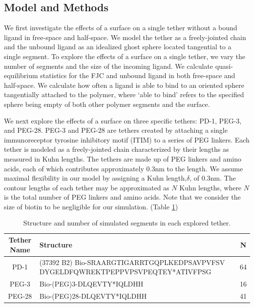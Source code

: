 \documentclass[../../AdvancementSummary.tex]{subfiles}
\begin{document}
\subsection{Model and Methods}

We first investigate the effects of a surface on a single tether without a bound ligand in free-space and half-space. We model the tether as a freely-jointed chain and the unbound ligand as an idealized ghost sphere located tangential to a single segment.  To explore the effects of a surface on a single tether, we vary the number of segments and the size of the incoming ligand. We calculate quasi-equilibrium statistics for the FJC and unbound ligand in both free-space and half-space. We calculate how often a ligand is able to bind to an oriented sphere tangentially attached to the polymer, where `able to bind' refers to the specified sphere being empty of both other polymer segments and the surface. 

We next explore the effects of a surface on three specific tethers: PD-1, PEG-3, and PEG-28.  PEG-3 and PEG-28 are tethers created by attaching a single immunoreceptor tyrosine inhibitory motif (ITIM) to a series of PEG linkers. Each tether is modeled as a freely-jointed chain characterized by their lengths as measured in Kuhn lengths. The tethers are made up of PEG linkers and amino acids, each of which contributes approximately 0.3nm to the length. We assume maximal flexibility in our model by assigning a Kuhn length,$\delta$, of 0.3nm. The contour lengths of each tether may be approximated as $N$ Kuhn lengths, where $N$ is the total number of PEG linkers and amino acids. Note that we consider the size of biotin to be negligible for our simulation. (Table \ref{table: Tethers})

\begin{table}
\caption{Structure and number of simulated segments in each explored tether. \label{table: Tethers}}
\begin{center}
\begin{tabular}{| c | p{10cm} | c |}
    \hline
        Tether Name & Structure & N \\ 
        \hline 
        PD-1    &   (37392 B2) Bio-SRAARGTIGARRTGQPLKEDPSAVPVFSV
                    DYGELDFQWREKTPEPPVPSVPEQTEY*ATIVFPSG            &   64   \\
        PEG-3   &   Bio-(PEG)3-DLQEVTY*IQLDHH                           &   16   \\ 
        PEG-28  &   Bio-(PEG)28-DLQEVTY*IQLDHH                          &   41   \\
    \hline
\end{tabular}
\end{center}
\end{table}
\end{document}
